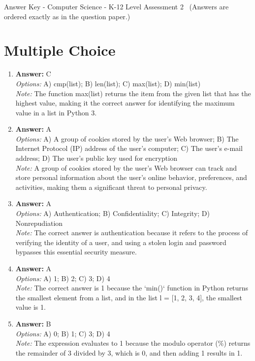 \documentclass[12pt]{article}
\begin{document}
\begin{center}
Answer Key - Computer Science - K-12 Level Assessment 2 \
\small (Answers are ordered exactly as in the question paper.)
\end{center}

\section*{Multiple Choice}
\begin{enumerate}[label=\arabic*.]
\item \textbf{Answer:} C
\\ \textit{Options:} A) cmp(list); B) len(list); C) max(list); D) min(list)
\\ \textit{Note:} The function max(list) returns the item from the given list that has the highest value, making it the correct answer for identifying the maximum value in a list in Python 3.
\item \textbf{Answer:} A
\\ \textit{Options:} A) A group of cookies stored by the user's Web browser; B) The Internet Protocol (IP) address of the user's computer; C) The user's e-mail address; D) The user's public key used for encryption
\\ \textit{Note:} A group of cookies stored by the user's Web browser can track and store personal information about the user's online behavior, preferences, and activities, making them a significant threat to personal privacy.
\item \textbf{Answer:} A
\\ \textit{Options:} A) Authentication; B) Confidentiality; C) Integrity; D) Nonrepudiation
\\ \textit{Note:} The correct answer is authentication because it refers to the process of verifying the identity of a user, and using a stolen login and password bypasses this essential security measure.
\item \textbf{Answer:} A
\\ \textit{Options:} A) 1; B) 2; C) 3; D) 4
\\ \textit{Note:} The correct answer is 1 because the `min()` function in Python returns the smallest element from a list, and in the list l = [1, 2, 3, 4], the smallest value is 1.
\item \textbf{Answer:} B
\\ \textit{Options:} A) 0; B) 1; C) 3; D) 4
\\ \textit{Note:} The expression evaluates to 1 because the modulo operator (\%) returns the remainder of 3 divided by 3, which is 0, and then adding 1 results in 1.
\end{enumerate}
\end{document}
